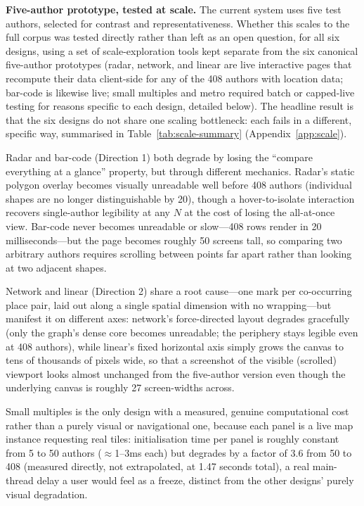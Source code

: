 \documentclass[logo,msc]{infthesis}
\begin{document}
\textbf{Five-author prototype, tested at scale.} The current system uses five test authors, selected for contrast and representativeness. Whether this scales to the full corpus was tested directly rather than left as an open question, for all six designs, using a set of scale-exploration tools kept separate from the six canonical five-author prototypes (radar, network, and linear are live interactive pages that recompute their data client-side for any of the 408 authors with location data; bar-code is likewise live; small multiples and metro required batch or capped-live testing for reasons specific to each design, detailed below). The headline result is that the six designs do not share one scaling bottleneck: each fails in a different, specific way, summarised in Table~\ref{tab:scale-summary} (Appendix~\ref{app:scale}).

Radar and bar-code (Direction 1) both degrade by losing the ``compare everything at a glance'' property, but through different mechanics. Radar's static polygon overlay becomes visually unreadable well before 408 authors (individual shapes are no longer distinguishable by 20), though a hover-to-isolate interaction recovers single-author legibility at any $N$ at the cost of losing the all-at-once view. Bar-code never becomes unreadable or slow---408 rows render in 20 milliseconds---but the page becomes roughly 50 screens tall, so comparing two arbitrary authors requires scrolling between points far apart rather than looking at two adjacent shapes.

Network and linear (Direction 2) share a root cause---one mark per co-occurring place pair, laid out along a single spatial dimension with no wrapping---but manifest it on different axes: network's force-directed layout degrades gracefully (only the graph's dense core becomes unreadable; the periphery stays legible even at 408 authors), while linear's fixed horizontal axis simply grows the canvas to tens of thousands of pixels wide, so that a screenshot of the visible (scrolled) viewport looks almost unchanged from the five-author version even though the underlying canvas is roughly 27 screen-widths across.

Small multiples is the only design with a measured, genuine computational cost rather than a purely visual or navigational one, because each panel is a live map instance requesting real tiles: initialisation time per panel is roughly constant from 5 to 50 authors ($\approx$1--3ms each) but degrades by a factor of 3.6 from 50 to 408 (measured directly, not extrapolated, at 1.47 seconds total), a real main-thread delay a user would feel as a freeze, distinct from the other designs' purely visual degradation.
\end{document}
